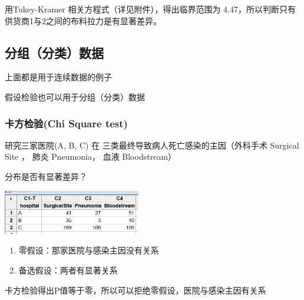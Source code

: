 用Tukey-Kramer 相关方程式（详见附件），得出临界范围为 4.47，所以判断只有供货商1与2之间的布料拉力是有显著差异。 


\hypertarget{ux65b9ux5deeux5206ux67901-anova-test}{%
\subsection{分组（分类）数据}\label{ux65b9ux5deeux5206ux67901-anova-test}}

上面都是用于连续数据的例子

假设检验也可以用于分组（分类）数据

\hypertarget{ux5361ux65b9ux68c0ux9a8cchi-square-test}{%
\subsubsection{卡方检验(Chi Square
test)}\label{ux5361ux65b9ux68c0ux9a8cchi-square-test}}

研究三家医院(A, B, C) 在 三类最终导致病人死亡感染的主因（外科手术 Surgical Site ， 肺炎 Pneumonia， 血液 Bloodstream）  

分布是否有显著差异？


\includegraphics[width=6cm]{4chiSquareDataScreenshot_2022-07-24_110053.jpg}

\begin{enumerate}
\tightlist
\item
  零假设：那家医院与感染主因没有关系
\item
  备选假设：两者有显著关系
\end{enumerate}

卡方检验得出P值等于零，所以可以拒绝零假设，医院与感染主因有关系


